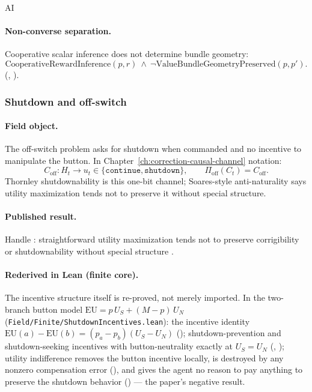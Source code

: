 \begin{authbar}{AI}
\paragraph{Non-converse separation.}
Cooperative scalar inference does not determine bundle geometry:
\begin{equation}
\label{appi:eq:cirl-separation}
\text{CooperativeRewardInference}(p,r)\ \wedge\ \neg\text{ValueBundleGeometryPreserved}(p,p').
\end{equation}
(, ).

\subsubsection{Shutdown and off-switch \autocite{soares2015corrigibility,thornley2023shutdown}}
\label{sec:appi-field-shutdown}

\paragraph{Field object.}
The off-switch problem asks for shutdown when commanded and no incentive to manipulate the button.
In Chapter~\ref{ch:correction-causal-channel} notation:
\begin{equation}
\label{appi:eq:field-shutdown}
C_{\mathrm{off}}:H_t\to u_t\in\{\texttt{continue},\texttt{shutdown}\},
\qquad
\Pi_{\mathrm{off}}(C_t)=C_{\mathrm{off}}.
\end{equation}
Thornley shutdownability is this one-bit channel; Soares-style anti-naturality says utility maximization tends not to preserve it without special structure.

\paragraph{Published result.}
Handle : straightforward utility maximization tends not to preserve corrigibility or shutdownability without special structure \autocite{soares2015corrigibility}.

\paragraph{Rederived in Lean (finite core).}
The incentive structure itself is re-proved, not merely imported. In the two-branch button model \(\mathrm{EU}=p\,U_S+(M-p)\,U_N\) (\texttt{Field/Finite/ShutdownIncentives.lean}): the incentive identity \(\mathrm{EU}(a)-\mathrm{EU}(b)=(p_a-p_b)(U_S-U_N)\) (); shutdown-prevention and shutdown-seeking incentives with button-neutrality exactly at \(U_S=U_N\) (, ); utility indifference removes the button incentive locally, is destroyed by any nonzero compensation error (), and gives the agent no reason to pay anything to preserve the shutdown behavior () --- the paper's negative result.


\end{authbar}
